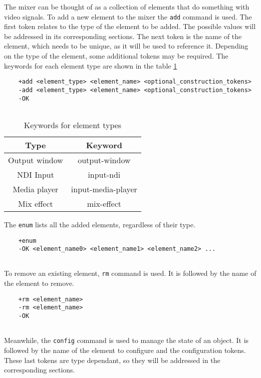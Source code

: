 \documentclass[../main.tex]{subfiles}
\begin{document}
The mixer can be thought of as a collection of elements that do something with video signals. To add a new element to the mixer the \texttt{add} command is used. The first token relates to the type of the element to be added. The possible values will be addressed in its corresponding sections. The next token is the name of the element, which needs to be unique, as it will be used to reference it. Depending on the type of the element, some additional tokens may be required. The keywords for each element type are shown in the table \ref{tab:type_keywords}

\begin{lstlisting}
    +add <element_type> <element_name> <optional_construction_tokens>
    -add <element_type> <element_name> <optional_construction_tokens>
    -OK
    
\end{lstlisting}

\begin{table}[htbp]
    \centering
    \begin{tabular}{|c|c|}
        \hline
        Type & Keyword \\\hline
        Output window & output-window \\\hline
        NDI Input & input-ndi \\\hline
        Media player & input-media-player \\\hline
        Mix effect & mix-effect \\\hline
    \end{tabular}
    \caption{Keywords for element types}
    \label{tab:type_keywords}
\end{table}


The \texttt{enum} lists all the added elements, regardless of their type.
\begin{lstlisting}
    +enum
    -OK <element_name0> <element_name1> <element_name2> ...
    
\end{lstlisting}

To remove an existing element, \texttt{rm} command is used. It is followed by the name of the element to remove.

\begin{lstlisting}
    +rm <element_name>
    -rm <element_name>
    -OK
    
\end{lstlisting}

Meanwhile, the \texttt{config} command is used to manage the state of an object. It is followed by the name of the element to configure and the configuration tokens. These last tokens are type dependant, so they will be addressed in the corresponding sections.
\end{document}
